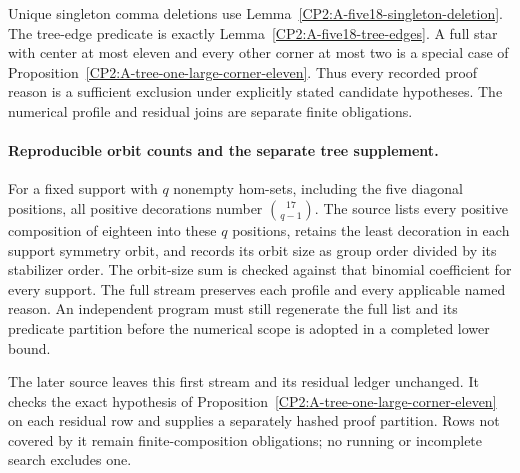 Unique singleton comma deletions use
Lemma~\ref{CP2:A-five18-singleton-deletion}. The tree-edge
predicate is exactly Lemma~\ref{CP2:A-five18-tree-edges}.
A full star with center at most eleven and every other
corner at most two is a special case of
Proposition~\ref{CP2:A-tree-one-large-corner-eleven}.
Thus every recorded proof reason is a sufficient exclusion
under explicitly stated candidate hypotheses. The numerical
profile and residual joins are separate finite obligations.

\paragraph{Reproducible orbit counts and the separate tree supplement.}
For a fixed support with $q$ nonempty hom-sets, including
the five diagonal positions, all positive decorations
number $\binom{17}{q-1}$. The source lists every positive
composition of eighteen into these $q$ positions, retains
the least decoration in each support symmetry orbit, and
records its orbit size as group order divided by its
stabilizer order. The orbit-size sum is checked against
that binomial coefficient for every support. The full
stream preserves each profile and every applicable named
reason. An independent program must still regenerate the
full list and its predicate partition before the numerical
scope is adopted in a completed lower bound.

The later source 
leaves this first stream and its residual ledger unchanged.
It checks the exact hypothesis of
Proposition~\ref{CP2:A-tree-one-large-corner-eleven} on
each residual row and supplies a separately hashed proof
partition. Rows not covered by it remain finite-composition
obligations; no running or incomplete search excludes one.
